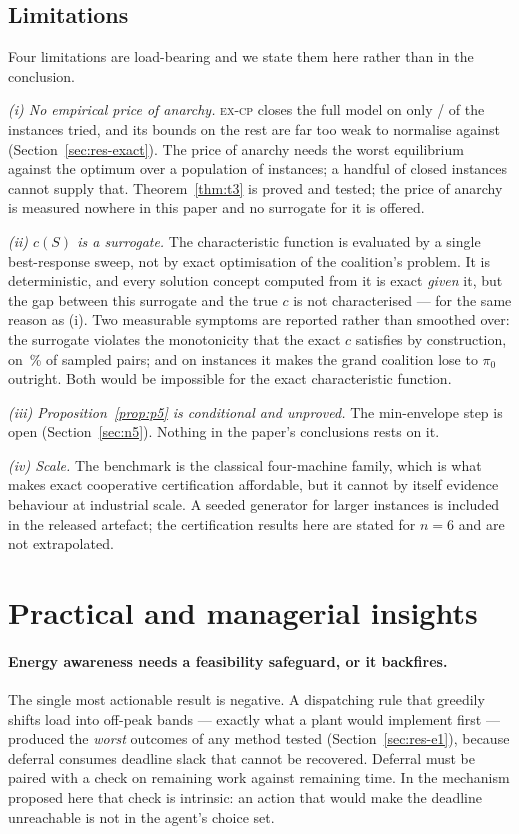 \documentclass[preprint, 3p, review, 12pt]{elsarticle}
\theoremstyle{definition}
\begin{document}
\subsection{Limitations}
\label{sec:limitations}
Four limitations are load-bearing and we state them here rather than in the conclusion.

\emph{(i) No empirical price of anarchy.} \textsc{ex-cp} closes the full model on only
/ of the instances tried, and its bounds on the rest
are far too weak to normalise against (Section~\ref{sec:res-exact}). The price of anarchy
needs the worst equilibrium against the optimum over a population of instances; a handful of
closed instances cannot supply that. Theorem~\ref{thm:t3} is proved and tested; the price of
anarchy is measured nowhere in this paper and no surrogate for it is offered.

\emph{(ii) $c(S)$ is a surrogate.} The characteristic function is evaluated by a single
best-response sweep, not by exact optimisation of the coalition's problem. It is
deterministic, and every solution concept computed from it is exact \emph{given} it, but the
gap between this surrogate and the true $c$ is not characterised --- for the same reason as
(i). Two measurable symptoms are reported rather than smoothed over: the surrogate violates
the monotonicity that the exact $c$ satisfies by construction, on
\,\% of sampled pairs; and on
 instances it makes the grand coalition lose to $\pi_0$
outright. Both would be impossible for the exact characteristic function.

\emph{(iii) Proposition~\ref{prop:p5} is conditional and unproved.} The min-envelope step is
open (Section~\ref{sec:n5}). Nothing in the paper's conclusions rests on it.

\emph{(iv) Scale.} The benchmark is the classical four-machine family, which is what makes
exact cooperative certification affordable, but it cannot by itself evidence behaviour at
industrial scale. A seeded generator for larger instances is included in the released
artefact; the certification results here are stated for $n=6$ and are not extrapolated.

\section{Practical and managerial insights}
\label{sec:insights}

\paragraph{Energy awareness needs a feasibility safeguard, or it backfires.}
The single most actionable result is negative. A dispatching rule that greedily shifts load
into off-peak bands --- exactly what a plant would implement first --- produced the
\emph{worst} outcomes of any method tested (Section~\ref{sec:res-e1}), because deferral
consumes deadline slack that cannot be recovered. Deferral must be paired with a check on
remaining work against remaining time. In the mechanism proposed here that check is intrinsic:
an action that would make the deadline unreachable is not in the agent's choice set.
\end{document}

